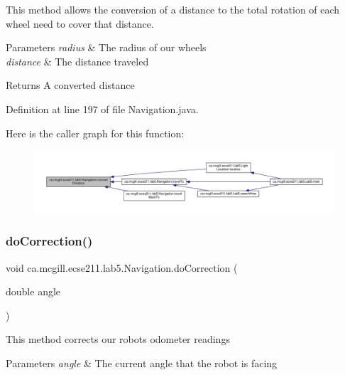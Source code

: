 This method allows the conversion of a distance to the total rotation of each wheel need to cover that distance.


\begin{DoxyParams}{Parameters}
{\em radius} & The radius of our wheels \\
\hline
{\em distance} & The distance traveled \\
\hline
\end{DoxyParams}
\begin{DoxyReturn}{Returns}
A converted distance 
\end{DoxyReturn}


Definition at line 197 of file Navigation.\+java.

Here is the caller graph for this function\+:
\nopagebreak
\begin{figure}[H]
\begin{center}
\leavevmode
\includegraphics[width=350pt]{classca_1_1mcgill_1_1ecse211_1_1lab5_1_1_navigation_a85122ad723d0988c118866f367073be6_icgraph}
\end{center}
\end{figure}
\mbox{\label{classca_1_1mcgill_1_1ecse211_1_1lab5_1_1_navigation_a73a89ddd822e0ba1cfd7a29c18aa7aea}} 
\subsubsection{\texorpdfstring{do\+Correction()}{doCorrection()}}
{\footnotesize\ttfamily void ca.\+mcgill.\+ecse211.\+lab5.\+Navigation.\+do\+Correction (\begin{DoxyParamCaption}\item[{double}]{angle }\end{DoxyParamCaption})}

This method corrects our robot\textquotesingle{}s odometer readings


\begin{DoxyParams}{Parameters}
{\em angle} & The current angle that the robot is facing \\
\hline
\end{DoxyParams}


